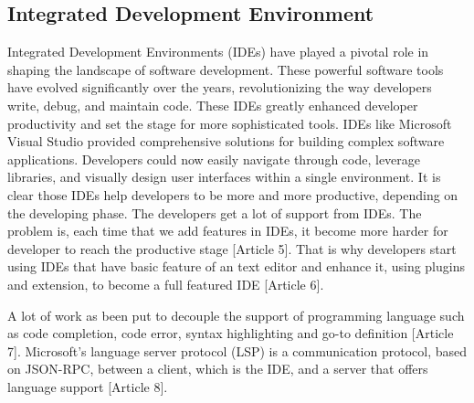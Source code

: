  \subsection{Integrated Development Environment}
 
Integrated Development Environments (IDEs) have played a pivotal role in shaping the landscape of software development. These powerful software tools have evolved significantly over the years, revolutionizing the way developers write, debug, and maintain code. These IDEs greatly enhanced developer productivity and set the stage for more sophisticated tools. IDEs like Microsoft Visual Studio provided comprehensive solutions for building complex software applications. Developers could now easily navigate through code, leverage libraries, and visually design user interfaces within a single environment. It is clear those IDEs help developers to be more and more productive, depending on the developing phase. The developers get a lot of support from IDEs. The problem is, each time that we add features in IDEs, it become more harder for developer to reach the  productive stage [Article 5]. That is why developers start using IDEs that have basic feature of an text editor and enhance it, using plugins and extension, to become a full featured IDE [Article 6]. 


A lot of work as been put to decouple the support of programming language such as code completion, code error, syntax highlighting and go-to definition [Article 7]. Microsoft's language server protocol (LSP) is a communication protocol, based on JSON-RPC, between a client, which is the IDE, and a server that oﬀers language support [Article 8].


